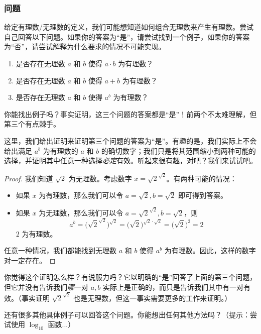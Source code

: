 \subsubsection*{问题}

给定有理数/无理数的定义，我们可能想知道如何组合无理数来产生有理数。尝试自己回答以下问题。如果你的答案为“是”，请尝试找到一个例子，如果你的答案为“否”，请尝试解释为什么要求的情况不可能实现。

\begin{enumerate}
    \item 是否存在无理数 $a$ 和 $b$ 使得 $a \cdot b$ 为有理数？
    \item 是否存在无理数 $a$ 和 $b$ 使得 $a + b$ 为有理数？
    \item 是否存在无理数 $a$ 和 $b$ 使得 $a^b$ 为有理数？
\end{enumerate}

你能找出例子吗？事实证明，这三个问题的答案都是“是”！前两个不太难理解，但第三个有点棘手。

这里，我们给出证明来证明第三个问题的答案为“是”。有趣的是，我们实际上不会给出满足 $a^b$ 为有理数的 $a$ 和 $b$ 的确切数字；我们只是将其范围缩小到两种可能的选择，并证明其中任意一种选择\textit{必定}有效。听起来很有趣，对吧？我们来试试吧。

\begin{proof}
    我们知道 $\sqrt{2}$ 为无理数。考虑数字 $x = \sqrt{2}^{\sqrt{2}}$。有两种可能的情况：
    \begin{itemize}
        \item 如果 $x$ 为有理数，那么我们可以令 $a = \sqrt{2}, b = \sqrt{2}$ 即可得到答案。
        \item 如果 $x$ 为无理数，那么我们可以令 $a = \sqrt{2}^{\sqrt{2}}, b = \sqrt{2}$，则
        \[a^b = \Bigg(\sqrt{2}^{\sqrt{2}}\Bigg)^{\sqrt{2}} = \Big(\sqrt{2}\Big)^{\sqrt{2} \cdot \sqrt{2}} = \Big(\sqrt{2}\Big)^2 = 2\]
        $2$ 为有理数。
    \end{itemize}
    任意一种情况，我们都能找到无理数 $a$ 和 $b$ 使得 $a^b$ 为有理数。因此，这样的数字对一定存在。
\end{proof}

你觉得这个证明怎么样？有说服力吗？它以明确的“是”回答了上面的第三个问题，但它并没有告诉我们\textit{哪}一对 $a, b$ 实际上是正确的，而只是告诉我们其中有一对有效。（事实证明 $\sqrt{2}^{\sqrt{2}}$ 也是无理数，但这一事实需要更多的工作来证明。）

还有很多其他具体例子可以回答这个问题。你能想出任何其他方法吗？（提示：尝试使用 $\log_{10}$ 函数...）
